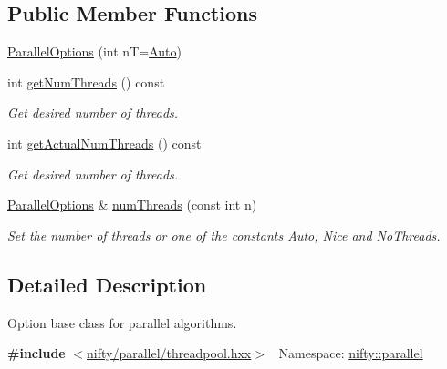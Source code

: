 \subsection*{Public Member Functions}
\begin{DoxyCompactItemize}
\item 
\hyperlink{classnifty_1_1parallel_1_1ParallelOptions_ae1b1ff787e99e1f4ea75a2d8cb7e3d43}{Parallel\+Options} (int n\+T=\hyperlink{classnifty_1_1parallel_1_1ParallelOptions_a7a945e8bd698883de4af0f906b2aa88aa0bd8f9fd00d78fcfdcb6ee1575f43fd6}{Auto})
\item 
int \hyperlink{classnifty_1_1parallel_1_1ParallelOptions_ab4f8893bc656a86116db578ea8e634ff}{get\+Num\+Threads} () const 
\begin{DoxyCompactList}\small\item\em Get desired number of threads. \end{DoxyCompactList}\item 
int \hyperlink{classnifty_1_1parallel_1_1ParallelOptions_a7dc7ea2f236660f51bb2e5497a5fefbf}{get\+Actual\+Num\+Threads} () const 
\begin{DoxyCompactList}\small\item\em Get desired number of threads. \end{DoxyCompactList}\item 
\hyperlink{classnifty_1_1parallel_1_1ParallelOptions}{Parallel\+Options} \& \hyperlink{classnifty_1_1parallel_1_1ParallelOptions_a50e3d373c07fb36be7b3b39bf6886b9b}{num\+Threads} (const int n)
\begin{DoxyCompactList}\small\item\em Set the number of threads or one of the constants {\ttfamily Auto}, {\ttfamily Nice} and {\ttfamily No\+Threads}. \end{DoxyCompactList}\end{DoxyCompactItemize}


\subsection{Detailed Description}
Option base class for parallel algorithms. 

{\bfseries \#include} $<$\hyperlink{threadpool_8hxx}{nifty/parallel/threadpool.\+hxx}$>$~\newline
 Namespace\+: \hyperlink{namespacenifty_1_1parallel}{nifty\+::parallel} 

